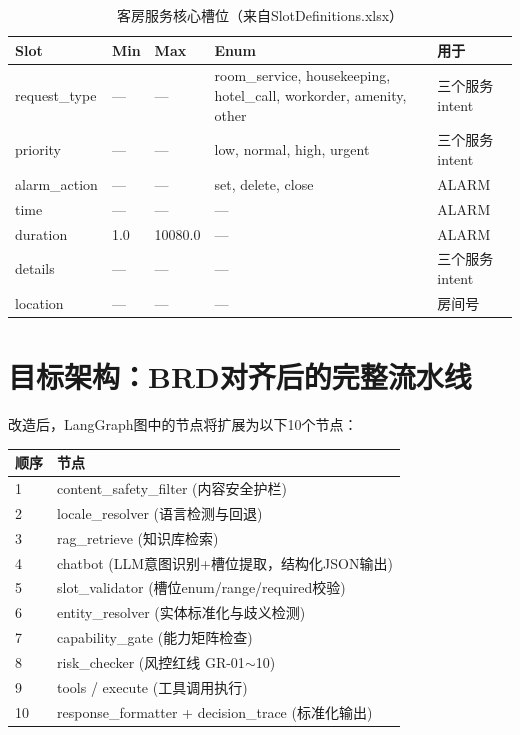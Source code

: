 \documentclass[12pt,a4paper]{ctexart}
\begin{document}
\begin{table}[h]
\centering
\begin{tabular}{@{}lllll@{}}
\toprule
\textbf{Slot} & \textbf{Min} & \textbf{Max} & \textbf{Enum} & \textbf{用于} \\
\midrule
request\_type & — & — & room\_service, housekeeping, hotel\_call, workorder, amenity, other & 三个服务intent \\
priority & — & — & low, normal, high, urgent & 三个服务intent \\
alarm\_action & — & — & set, delete, close & ALARM \\
time & — & — & — & ALARM \\
duration & 1.0 & 10080.0 & — & ALARM \\
details & — & — & — & 三个服务intent \\
location & — & — & — & 房间号 \\
\bottomrule
\end{tabular}
\caption{客房服务核心槽位（来自SlotDefinitions.xlsx）}
\end{table}

\newpage

\section{目标架构：BRD对齐后的完整流水线}

改造后，LangGraph图中的节点将扩展为以下10个节点：

\begin{center}
\begin{tabular}{@{}ll@{}}
\toprule
\textbf{顺序} & \textbf{节点} \\
\midrule
1 & content\_safety\_filter (内容安全护栏) \\
2 & locale\_resolver (语言检测与回退) \\
3 & rag\_retrieve (知识库检索) \\
4 & chatbot (LLM意图识别+槽位提取，结构化JSON输出) \\
5 & slot\_validator (槽位enum/range/required校验) \\
6 & entity\_resolver (实体标准化与歧义检测) \\
7 & capability\_gate (能力矩阵检查) \\
8 & risk\_checker (风控红线 GR-01$\sim$10) \\
9 & tools / execute (工具调用执行) \\
10 & response\_formatter + decision\_trace (标准化输出) \\
\bottomrule
\end{tabular}
\end{center}
\end{document}
